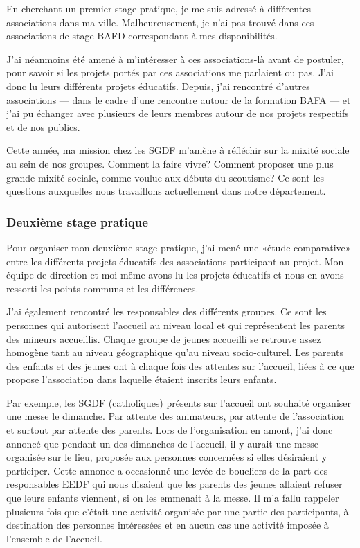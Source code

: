 \documentclass[titlepage,11pt,a4paper]{article}
\begin{document}
En cherchant un premier stage pratique, je me suis
adressé à différentes associations dans ma ville. Malheureusement, je n'ai pas trouvé dans
ces associations de stage BAFD correspondant à mes disponibilités.

J'ai néanmoins été amené à m'intéresser à ces associations-là avant de postuler, pour
savoir si les projets portés par ces associations me parlaient ou pas. J'ai donc lu leurs
différents projets éducatifs. Depuis, j'ai rencontré d'autres associations --- dans le cadre
d'une rencontre autour de la formation BAFA --- et j'ai pu échanger avec plusieurs
de leurs membres autour de nos projets respectifs et de nos publics.

Cette année, ma mission chez les SGDF m'amène à réfléchir sur la mixité sociale au sein de
nos groupes. Comment la faire vivre? Comment proposer une plus grande mixité sociale,
comme voulue aux débuts du scoutisme? Ce sont les questions auxquelles nous travaillons
actuellement dans notre département.

\subsubsection{Deuxième stage pratique}

Pour organiser mon deuxième stage pratique, j'ai mené une «étude comparative» entre les
différents projets éducatifs des associations participant au projet. Mon équipe de
direction et moi-même avons lu les projets éducatifs et nous en avons ressorti les
points communs et les différences.

J'ai également rencontré les responsables des différents groupes. Ce sont les personnes qui
autorisent l'accueil au niveau local et qui représentent les parents des mineurs
accueillis. Chaque groupe de jeunes accueilli se retrouve assez homogène tant au niveau
géographique qu'au niveau socio-culturel. Les parents des enfants et des jeunes ont à
chaque fois des attentes sur l'accueil, liées à ce que propose l'association dans laquelle
étaient inscrits leurs enfants.

Par exemple, les SGDF (catholiques) présents sur l'accueil ont souhaité organiser une
messe le dimanche. Par attente des animateurs, par attente de l'association et surtout
par attente des parents. Lors de l'organisation en amont, j'ai donc annoncé que pendant
un des dimanches de l'accueil, il y aurait une messe organisée sur le lieu, proposée aux personnes
concernées si elles désiraient y participer. Cette annonce a occasionné une levée de
boucliers de la part des responsables EEDF qui nous disaient que les parents des jeunes
allaient refuser que leurs enfants viennent, si on les emmenait à la messe. Il m'a fallu
rappeler plusieurs fois que c'était une activité organisée par une partie des
participants, à destination des personnes intéressées et en aucun cas une activité imposée
à l'ensemble de l'accueil.
\end{document}
